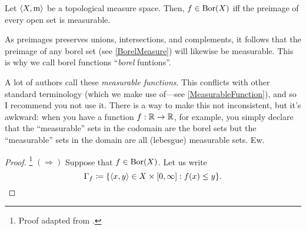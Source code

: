 \begin{prp}\label{BorelIsBorel}
Let $\langle X,\mathrm{m}\rangle$ be a topological measure space.  Then, $f\in \operatorname{Bor} (X)$ iff the preimage of every open set is measurable.
\begin{rmk}
As preimages preserves unions, intersections, and complements, it follows that the preimage of any borel set (see \cref{BorelMeasure}) will likewise be measurable.  This is why we call borel functions ``\emph{borel} funtions''.
\end{rmk}
\begin{rmk}
A lot of authors call these \emph{measurable functions}.  This conflicts with other standard terminology (which we make use of---see \cref{MeasurableFunction}), and so I recommend you not use it.  There is a way to make this not inconsistent, but it's awkward:  when you have a function $f:\mathbb{R} \rightarrow \mathbb{R}$, for example, you simply declare that the ``measurable'' sets in the codomain are the borel sets but the ``measurable'' sets in the domain are all (lebesgue) measurable sets.  Ew.
\end{rmk}
\begin{proof}\footnote{Proof adapted from \cite[pg.~384]{Pugh}.}
$(\Rightarrow )$ Suppose that $f\in \operatorname{Bor} (X)$.  Let us write
\begin{equation}
\Gamma _f\coloneqq \{ \langle x,y\rangle\in X\times [0,\infty ]:f(x)\leq y\} .
\end{equation}


\end{proof}
\end{prp}
